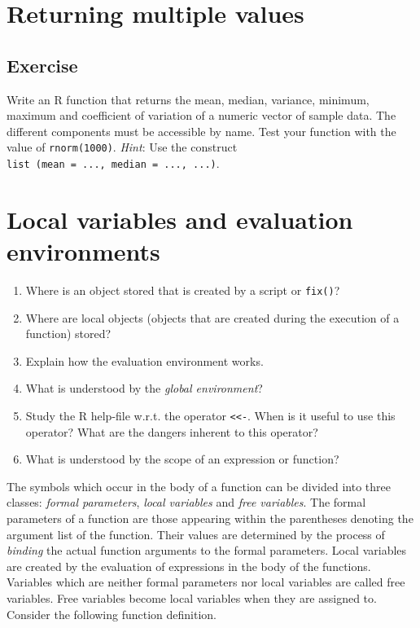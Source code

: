 \documentclass[
]{book}
\begin{document}
\section{Returning multiple values}\label{returning-multiple-values}

\subsection{Exercise}\label{exercise-11}

Write an R function that returns the mean, median, variance, minimum, maximum and coefficient of variation of a numeric vector of sample data. The different components must be accessible by name. Test your function with the value of \texttt{rnorm(1000)}. \emph{Hint}: Use the construct \texttt{list\ (mean\ =\ ...,\ median\ =\ ...,\ ...)}.

\section{Local variables and evaluation environments}\label{local-variables-and-evaluation-environments}

\begin{enumerate}
\def\labelenumi{(\alph{enumi})}
\item
  Where is an object stored that is created by a script or \texttt{fix()}?
\item
  Where are local objects (objects that are created during the execution of a function) stored?
\item
  Explain how the evaluation environment works.
\item
  What is understood by the \emph{{global environment}}?
\item
  Study the R help-file w.r.t. the operator \texttt{\textless{}\textless{}-}. When is it useful to use this operator? What are the dangers inherent to this operator?
\item
  What is understood by the scope of an expression or function?
\end{enumerate}

The symbols which occur in the body of a function can be divided into three classes: \emph{{formal parameters}}, \emph{{local variables}} and \emph{{free variables}}. The formal parameters of a function are those appearing within the parentheses denoting the argument list of the function. Their values are determined by the process of \emph{{binding}} the actual function arguments to the formal parameters. Local variables are created by the evaluation of expressions in the body of the functions. Variables which are neither formal parameters nor local variables are called free variables. Free variables become local variables when they are assigned to. Consider the following function definition.
\end{document}

